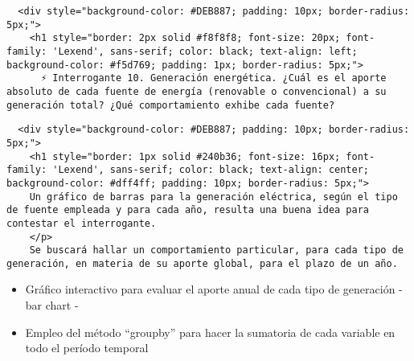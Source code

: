 \documentclass[11pt]{article}
\providecommand{\tightlist}{%
      \setlength{\itemsep}{0pt}\setlength{\parskip}{0pt}}
\begin{document}
    \begin{verbatim}
  <div style="background-color: #DEB887; padding: 10px; border-radius: 5px;">
    <h1 style="border: 2px solid #f8f8f8; font-size: 20px; font-family: 'Lexend', sans-serif; color: black; text-align: left; background-color: #f5d769; padding: 1px; border-radius: 5px;">
      ⚡ Interrogante 10. Generación energética. ¿Cuál es el aporte absoluto de cada fuente de energía (renovable o convencional) a su generación total? ¿Qué comportamiento exhibe cada fuente?
\end{verbatim}

    \begin{verbatim}
  <div style="background-color: #DEB887; padding: 10px; border-radius: 5px;">
    <h1 style="border: 1px solid #240b36; font-size: 16px; font-family: 'Lexend', sans-serif; color: black; text-align: center; background-color: #dff4ff; padding: 10px; border-radius: 5px;">
    Un gráfico de barras para la generación eléctrica, según el tipo de fuente empleada y para cada año, resulta una buena idea para contestar el interrogante.
    </p>
    Se buscará hallar un comportamiento particular, para cada tipo de generación, en materia de su aporte global, para el plazo de un año.
\end{verbatim}

    \begin{itemize}
\tightlist
\item
  Gráfico interactivo para evaluar el aporte anual de cada tipo de
  generación - bar chart -
\item
  Empleo del método ``groupby'' para hacer la sumatoria de cada variable
  en todo el período temporal
\end{itemize}
\end{document}
